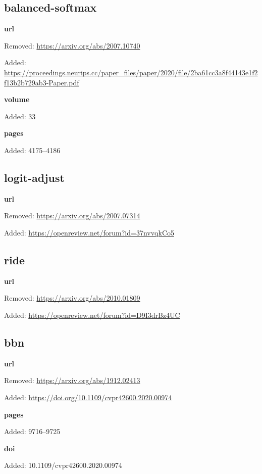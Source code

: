 \subsection*{balanced-softmax}
\noindent\textbf{url}\par
{\color{AuditRed}Removed: \url{https://arxiv.org/abs/2007.10740}\par}
{\color{AuditGreen}Added: \url{https://proceedings.neurips.cc/paper_files/paper/2020/file/2ba61cc3a8f44143e1f2f13b2b729ab3-Paper.pdf}\par}
\noindent\textbf{volume}\par
{\color{AuditGreen}Added: 33\par}
\noindent\textbf{pages}\par
{\color{AuditGreen}Added: 4175–4186\par}
\medskip

\subsection*{logit-adjust}
\noindent\textbf{url}\par
{\color{AuditRed}Removed: \url{https://arxiv.org/abs/2007.07314}\par}
{\color{AuditGreen}Added: \url{https://openreview.net/forum?id=37nvvqkCo5}\par}
\medskip

\subsection*{ride}
\noindent\textbf{url}\par
{\color{AuditRed}Removed: \url{https://arxiv.org/abs/2010.01809}\par}
{\color{AuditGreen}Added: \url{https://openreview.net/forum?id=D9I3drBz4UC}\par}
\medskip

\subsection*{bbn}
\noindent\textbf{url}\par
{\color{AuditRed}Removed: \url{https://arxiv.org/abs/1912.02413}\par}
{\color{AuditGreen}Added: \url{https://doi.org/10.1109/cvpr42600.2020.00974}\par}
\noindent\textbf{pages}\par
{\color{AuditGreen}Added: 9716–9725\par}
\noindent\textbf{doi}\par
{\color{AuditGreen}Added: 10.1109/cvpr42600.2020.00974\par}
\medskip


